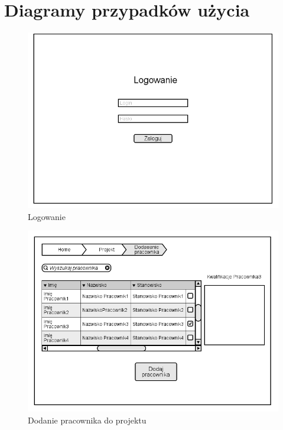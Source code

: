 \section{Diagramy przypadków użycia}
\begin{figure}[H]
    \centering
    \includegraphics[scale=0.7]{diagramy/intefejsy/Logowanie.png}
    \caption{Logowanie}
    \label{fig:usecase}
\end{figure}

\begin{figure}[H]
    \includegraphics[scale=0.7]{diagramy/intefejsy/Dodanie_pracownika_do_projektu.png}
    \caption{Dodanie pracownika do projektu}
    \label{fig:usecase}
\end{figure}

